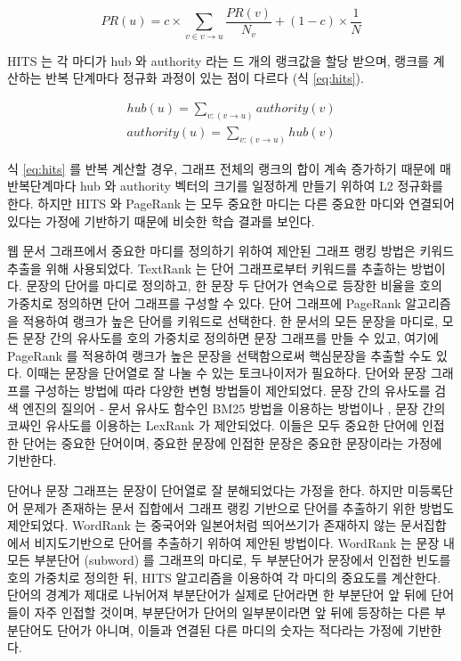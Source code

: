 \documentclass[oneside, ko,phd]{snuthesis_utf8_kor}
\begin{document}
\begin{equation}
  \label{eq:pagerank2}
  PR(u) = c \times \sum_{v \in v \rightarrow u} \frac{PR(v)}{N_v} + (1-c) \times \frac{1}{N}
\end{equation}

HITS 는 각 마디가 hub 와 authority 라는 드 개의 랭크값을 할당 받으며, 랭크를 계산하는 반복 단계마다 정규화 과정이 있는 점이 다르다 (식 \ref{eq:hits}).

\begin{equation}
  \label{eq:hits}
  \begin{aligned}
  hub(u) = \sum_{v:(v \rightarrow u)} authority(v) \\
  authority(u) = \sum_{v:(v \rightarrow u)} hub(v)
  \end{aligned}
\end{equation}

식 \ref{eq:hits} 를 반복 계산할 경우, 그래프 전체의 랭크의 합이 계속 증가하기 때문에 매 반복단계마다 hub 와 authority 벡터의 크기를 일정하게 만들기 위하여 L2 정규화를 한다.
하지만 HITS 와 PageRank 는 모두 중요한 마디는 다른 중요한 마디와 연결되어 있다는 가정에 기반하기 때문에 비슷한 학습 결과를 보인다.

웹 문서 그래프에서 중요한 마디를 정의하기 위하여 제안된 그래프 랭킹 방법은 키워드 추출을 위해 사용되었다.
TextRank \cite{mihalcea2004textrank} 는 단어 그래프로부터 키워드를 추출하는 방법이다.
문장의 단어를 마디로 정의하고, 한 문장 두 단어가 연속으로 등장한 비율을 호의 가중치로 정의하면 단어 그래프를 구성할 수 있다.
단어 그래프에 PageRank 알고리즘을 적용하여 랭크가 높은 단어를 키워드로 선택한다.
한 문서의 모든 문장을 마디로, 모든 문장 간의 유사도를 호의 가중치로 정의하면 문장 그래프를 만들 수 있고, 여기에 PageRank 를 적용하여 랭크가 높은 문장을 선택함으로써 핵심문장을 추출할 수도 있다.
이때는 문장을 단어열로 잘 나눌 수 있는 토크나이저가 필요하다.
단어와 문장 그래프를 구성하는 방법에 따라 다양한 변형 방법들이 제안되었다.
문장 간의 유사도를 검색 엔진의 질의어 - 문서 유사도 함수인 BM25 \cite{robertson2009probabilistic} 방법을 이용하는 방법이나 \cite{barrios2016variations}, 문장 간의 코싸인 유사도를 이용하는 LexRank \cite{erkan2004lexrank} 가 제안되었다.
이들은 모두 중요한 단어에 인접한 단어는 중요한 단어이며, 중요한 문장에 인접한 문장은 중요한 문장이라는 가정에 기반한다.

단어나 문장 그래프는 문장이 단어열로 잘 분해되었다는 가정을 한다.
하지만 미등록단어 문제가 존재하는 문서 집합에서 그래프 랭킹 기반으로 단어를 추출하기 위한 방법도 제안되었다.
WordRank \cite{chen2011simple} 는 중국어와 일본어처럼 띄어쓰기가 존재하지 않는 문서집합에서 비지도기반으로 단어를 추출하기 위하여 제안된 방법이다.
WordRank 는 문장 내 모든 부분단어 (subword) 를 그래프의 마디로, 두 부분단어가 문장에서 인접한 빈도를 호의 가중치로 정의한 뒤, HITS 알고리즘을 이용하여 각 마디의 중요도를 계산한다.
단어의 경계가 제대로 나뉘어져 부분단어가 실제로 단어라면 한 부분단어 앞 뒤에 단어들이 자주 인접할 것이며, 부분단어가 단어의 일부분이라면 앞 뒤에 등장하는 다른 부분단어도 단어가 아니며, 이들과 연결된 다른 마디의 숫자는 적다라는 가정에 기반한다.
\end{document}
